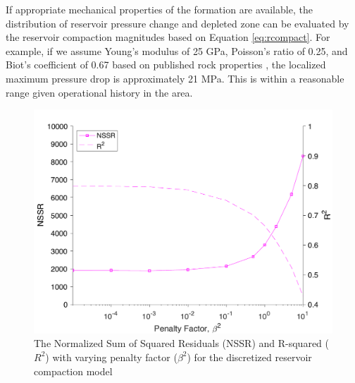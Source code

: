 If appropriate mechanical properties of the formation are available, the distribution of reservoir pressure change and depleted zone can be evaluated by the reservoir compaction magnitudes based on Equation \eqref{eq:rcompact}. For example, if we assume Young’s modulus of 25 GPa, Poisson’s ratio of 0.25, and Biot’s coefficient of 0.67 based on published rock properties \cite{Shukla2013NanoindentationStudiesShales, Xu2015AnalysisStressVariations}, the localized maximum pressure drop is approximately 21 MPa. This is within a reasonable range given operational history in the area.



\begin{figure}
	\centering
	\includegraphics[width=\textwidth]{paper1-permian/figures/supplement/figureS12-reservoir-nssr.pdf}
	\caption[ Normalized Sum of Squared Residuals (NSSR) and R-squared for reservoir compaction model]{The Normalized Sum of Squared Residuals (NSSR) and R-squared ($ R^2 $) with varying penalty factor ($ \beta^2 $) for the discretized reservoir compaction model
	}
	\label{fig:model-reservoir-nssr}
\end{figure}

